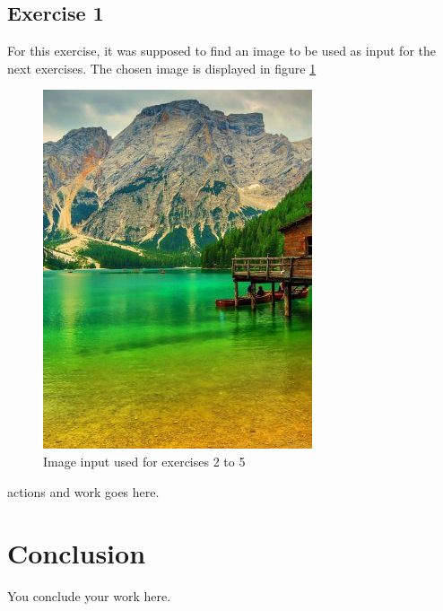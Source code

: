 \documentclass[]{IEEEtran}
\begin{document}
  \subsection{Exercise 1}
  For this exercise, it was supposed to find an image to be used as input for the next exercises. The chosen image is displayed in figure \ref{fig:i-1-0}
  \begin{figure}[!h]
    \centering
    \includegraphics{../input/i-1-0.jpg}
    \caption{Image input used for exercises 2 to 5}
    \label{fig:i-1-0}
  \end{figure}

  actions and work goes here.
  
  \section{Conclusion}
  
  You conclude your work here.
  
\end{document}
